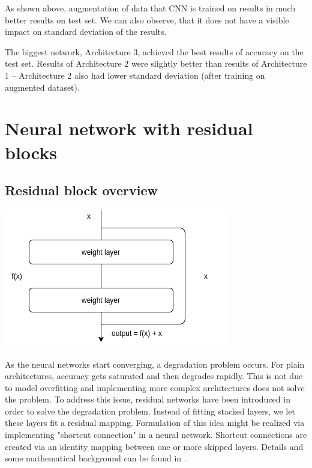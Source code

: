 \documentclass{article}
\begin{document}
As shown above, augmentation of data that CNN is trained on results in much better results on test set. We can also observe, that it does not have a visible impact on standard deviation of the results. 

The biggest network, Architecture 3, achieved the best results of accuracy on the test set. Results of Architecture 2 were slightly better than results of Architecture 1 -- Architecture 2 also had lower standard deviation (after training on augmented dataset).  

\newpage
\section{Neural network with residual blocks}

\subsection{Residual block overview}

\begin{center}
\includegraphics[scale=0.6]{resblock01.png}
\end{center}

As the neural networks start converging, a degradation problem occurs. For plain architectures, accuracy gets saturated and then degrades rapidly. This is not due to model overfitting and implementing more complex architectures does not solve the problem.
To address this issue, residual networks have been introduced in order to solve the degradation problem. Instead of fitting stacked layers, we let these layers fit a residual mapping. Formulation of this idea might be realized via implementing "shortcut connection" in a neural network.
Shortcut connections are created via an identity mapping between one or more skipped layers. Details and some mathematical background can be found in \cite{residual}.
\end{document}
